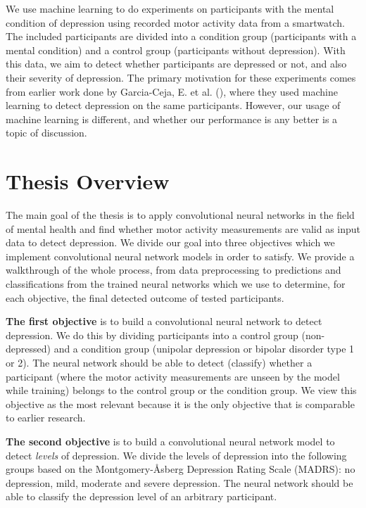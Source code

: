We use machine learning to do experiments on participants with the mental condition of depression using recorded motor activity data from a smartwatch. The included participants are divided into a condition group (participants with a mental condition) and a control group (participants without depression). With this data, we aim to detect whether participants are depressed or not, and also their severity of depression. The primary motivation for these experiments comes from earlier work done by Garcia-Ceja, E. et al. (\cite{GarciaCeja2018_classification_bipolar}), where they used machine learning to detect depression on the same participants. However, our usage of machine learning is different, and whether our performance is any better is a topic of discussion.

\section{Thesis Overview}
The main goal of the thesis is to apply convolutional neural networks in the field of mental health and find whether motor activity measurements are valid as input data to detect depression. We divide our goal into three objectives which we implement convolutional neural network models in order to satisfy. We provide a walkthrough of the whole process, from data preprocessing to predictions and classifications from the trained neural networks which we use to determine, for each objective, the final detected outcome of tested participants.

\textbf{The first objective} is to build a convolutional neural network to detect depression. We do this by dividing participants into a control group (non-depressed) and a condition group (unipolar depression or bipolar disorder type 1 or 2). The neural network should be able to detect (classify) whether a participant (where the motor activity measurements are unseen by the model while training) belongs to the control group or the condition group. We view this objective as the most relevant because it is the only objective that is comparable to earlier research.

\textbf{The second objective} is to build a convolutional neural network model to detect \textit{levels} of depression. We divide the levels of depression into the following groups based on the Montgomery-Åsberg Depression Rating Scale (MADRS): no depression, mild, moderate and severe depression. The neural network should be able to classify the depression level of an arbitrary participant.

